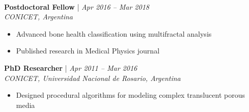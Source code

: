 \documentclass[11pt,a4paper]{article}
\newcommand{\role}[2]{\textbf{#1} | \textit{#2}}
\begin{document}
\begin{minipage}[c]{0.6\linewidth}
\\
\role{Postdoctoral Fellow}{Apr 2016 -- Mar 2018}\\
\textit{CONICET, Argentina}
\begin{itemize}[leftmargin=*,nosep]
\item Advanced bone health classification using multifractal analysis
\item Published research in Medical Physics journal
\end{itemize}

\vspace{0.1cm}

\role{PhD Researcher}{Apr 2011 -- Mar 2016}\\
\textit{CONICET, Universidad Nacional de Rosario, Argentina}
\begin{itemize}[leftmargin=*,nosep]
\item Designed procedural algorithms for modeling complex translucent porous media
\end{itemize}

\end{minipage}
\end{document}

